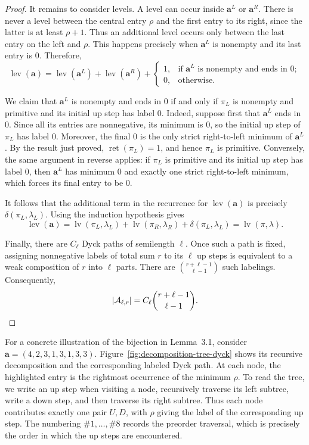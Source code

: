 \documentclass[12pt]{amsart}
\theoremstyle{plain}
\theoremstyle{definition}
\DeclareMathOperator{\lv}{lv}
\DeclareMathOperator{\ret}{ret}
\DeclareMathOperator{\lev}{lev}
\begin{document}
\begin{proof}
It remains to consider levels. A level can occur inside
$\mathbf{a}^{L}$ or $\mathbf{a}^{R}$. There is never a level between
the central entry $\rho$ and the first entry to its right, since the
latter is at least $\rho+1$. Thus an additional level occurs only
between the last entry on the left and $\rho$. This happens precisely
when $\mathbf{a}^{L}$ is nonempty and its last entry is $0$. Therefore,
\[
\lev(\mathbf{a})
=
\lev(\mathbf{a}^{L})
+
\lev(\mathbf{a}^{R})
+
\begin{cases}
1, & \text{if $\mathbf{a}^{L}$ is nonempty and ends in $0$};\\
0, & \text{otherwise}.
\end{cases}
\]

We claim that $\mathbf{a}^{L}$ is nonempty and ends in $0$ if and only if
$\pi_L$ is nonempty and primitive and its initial up step has label $0$.
Indeed, suppose first that $\mathbf{a}^{L}$ ends in $0$. Since all its
entries are nonnegative, its minimum is $0$, so the initial up step of
$\pi_L$ has label $0$. Moreover, the final $0$ is the only strict
right-to-left minimum of $\mathbf{a}^{L}$. By the result just proved,
$\ret(\pi_L)=1$, and hence $\pi_L$ is primitive. Conversely, the same argument in reverse applies: if $\pi_L$ is primitive
and its initial up step has label $0$, then $\mathbf{a}^{L}$ has minimum
$0$ and exactly one strict right-to-left minimum, which forces its final
entry to be $0$.

It follows that the additional term in the recurrence for
$\lev(\mathbf{a})$ is precisely
$\delta(\pi_L,\lambda_L)$. Using the induction hypothesis gives
\[
\lev(\mathbf{a})
=
\lv(\pi_L,\lambda_L)
+
\lv(\pi_R,\lambda_R)
+
\delta(\pi_L,\lambda_L)
=
\lv(\pi,\lambda).
\]


Finally, there are $C_\ell$ Dyck paths of semilength $\ell$. Once such a
path is fixed, assigning nonnegative labels of total sum $r$ to its
$\ell$ up steps is equivalent to a weak composition of $r$ into $\ell$
parts. There are $\binom{r+\ell-1}{\ell-1}$ such labelings. Consequently,
\[
\lvert\mathcal{A}_{\ell,r}\rvert
=
C_\ell\binom{r+\ell-1}{\ell-1}. \qedhere
\]
\end{proof}



For a concrete illustration of the bijection in Lemma~3.1, consider
$\mathbf a=(4,2,3,1,3,1,3,3)$. Figure~\ref{fig:decomposition-tree-dyck} shows its recursive decomposition
and the corresponding labeled Dyck path. At each node, the highlighted
entry is the rightmost occurrence of the minimum $\rho$. To read the tree,
we write an up step when visiting a node, recursively traverse its left
subtree, write a down step, and then traverse its right subtree. Thus each
node contributes exactly one pair $U,D$, with $\rho$ giving the label of
the corresponding up step. The numbering $\#1,\ldots,\#8$ records the
preorder traversal, which is precisely the order in which the up steps are
encountered.
\end{document}
